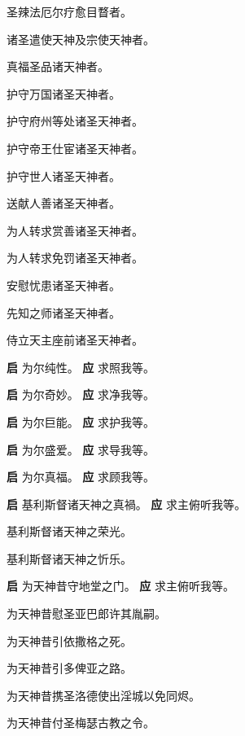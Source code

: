 \documentclass[UTF8,17pt]{ctexart}
\begin{document}
 圣辣法厄尔疗愈⽬瞀者。

 诸圣遣使天神及宗使天神者。

 真福圣品诸天神者。

 护守万国诸圣天神者。

 护守府州等处诸圣天神者。

 护守帝王仕宦诸圣天神者。

 护守世⼈诸圣天神者。

 送献⼈善诸圣天神者。

 为⼈转求赏善诸圣天神者。

 为⼈转求免罚诸圣天神者。

 安慰忧患诸圣天神者。

 先知之师诸圣天神者。

 侍⽴天主座前诸圣天神者。

\textbf{启} \quad 为尔纯性。 \hfill \textbf{应} \quad 求照我等。

\textbf{启} \quad 为尔奇妙。 \hfill \textbf{应} \quad 求净我等。

\textbf{启} \quad 为尔巨能。 \hfill \textbf{应} \quad 求护我等。

\textbf{启} \quad 为尔盛爱。 \hfill \textbf{应} \quad 求导我等。

\textbf{启} \quad 为尔真福。 \hfill \textbf{应} \quad 求顾我等。

\textbf{启} \quad 基利斯督诸天神之真禍。 \hfill \textbf{应} \quad 求主俯听我等。

 基利斯督诸天神之荣光。

 基利斯督诸天神之忻乐。

\textbf{启} \quad 为天神昔守地堂之门。 \hfill \textbf{应} \quad 求主俯听我等。

 为天神昔慰圣亚巴郎许其胤嗣。

 为天神昔引依撒格之死。

 为天神昔引多俾亚之路。

 为天神昔携圣洛德使出淫城以免同烬。

 为天神昔付圣梅瑟古教之令。
\end{document}
